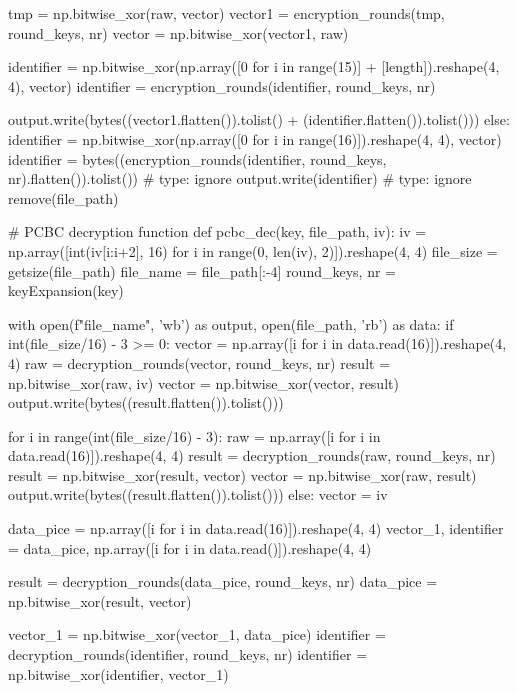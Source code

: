 \begin{python}
            tmp = np.bitwise_xor(raw, vector)
            vector1 = encryption_rounds(tmp, round_keys, nr)
            vector = np.bitwise_xor(vector1, raw)

            identifier = np.bitwise_xor(np.array([0 for i in range(15)] + [length]).reshape(4, 4), vector)
            identifier = encryption_rounds(identifier, round_keys, nr)

            output.write(bytes((vector1.flatten()).tolist() + (identifier.flatten()).tolist()))
        else:
            identifier = np.bitwise_xor(np.array([0 for i in range(16)]).reshape(4, 4), vector)
            identifier = bytes((encryption_rounds(identifier, round_keys, nr).flatten()).tolist())  # type: ignore
            output.write(identifier)  # type: ignore
    remove(file_path)


# PCBC decryption function
def pcbc_dec(key, file_path, iv):
    iv = np.array([int(iv[i:i+2], 16) for i in range(0, len(iv), 2)]).reshape(4, 4)
    file_size = getsize(file_path)
    file_name = file_path[:-4]
    round_keys, nr = keyExpansion(key)

    with open(f"{file_name}", 'wb') as output, open(file_path, 'rb') as data:
        if int(file_size/16) - 3 >= 0:
            vector = np.array([i for i in data.read(16)]).reshape(4, 4)
            raw = decryption_rounds(vector, round_keys, nr)
            result = np.bitwise_xor(raw, iv)
            vector = np.bitwise_xor(vector, result)
            output.write(bytes((result.flatten()).tolist()))

            for i in range(int(file_size/16) - 3):
                raw = np.array([i for i in data.read(16)]).reshape(4, 4)
                result = decryption_rounds(raw, round_keys, nr)
                result = np.bitwise_xor(result, vector)
                vector = np.bitwise_xor(raw, result)
                output.write(bytes((result.flatten()).tolist()))
        else:
            vector = iv

        data_pice = np.array([i for i in data.read(16)]).reshape(4, 4)
        vector_1, identifier = data_pice, np.array([i for i in data.read()]).reshape(4, 4)

        result = decryption_rounds(data_pice, round_keys, nr)
        data_pice = np.bitwise_xor(result, vector)

        vector_1 = np.bitwise_xor(vector_1, data_pice)
        identifier = decryption_rounds(identifier, round_keys, nr)
        identifier = np.bitwise_xor(identifier, vector_1)


\end{python}
